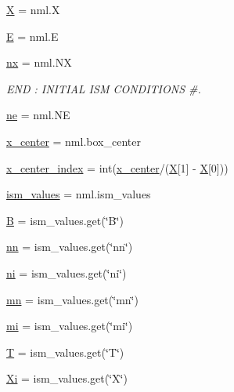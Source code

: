 \begin{DoxyCompactItemize}
\item 
\hyperlink{namespacesetup__adv_a6d9cd2ec966fe51739f30fabc346a12b}{X} = nml.\+X
\item 
\hyperlink{namespacesetup__adv_a5934fd9692b0afe75afd78fb1f301443}{E} = nml.\+E
\item 
\hyperlink{namespacesetup__adv_ae3a170bc8896f73d548a63402f551b27}{nx} = nml.\+NX
\begin{DoxyCompactList}\small\item\em E\+ND \+: I\+N\+I\+T\+I\+AL I\+SM C\+O\+N\+D\+I\+T\+I\+O\+NS \#. \end{DoxyCompactList}\item 
\hyperlink{namespacesetup__adv_a24c4d54f61a1e12e603b4c01192130b1}{ne} = nml.\+NE
\item 
\hyperlink{namespacesetup__adv_affa314aa4c3619c6df4ab64ad91ddfe4}{x\+\_\+center} = nml.\+box\+\_\+center
\item 
\hyperlink{namespacesetup__adv_aa4b9207992c9429f9848abddc21a9761}{x\+\_\+center\+\_\+index} = int(\hyperlink{namespacesetup__adv_affa314aa4c3619c6df4ab64ad91ddfe4}{x\+\_\+center}/(\hyperlink{namespacesetup__adv_a6d9cd2ec966fe51739f30fabc346a12b}{X}\mbox{[}1\mbox{]} -\/ \hyperlink{namespacesetup__adv_a6d9cd2ec966fe51739f30fabc346a12b}{X}\mbox{[}0\mbox{]}))
\item 
\hyperlink{namespacesetup__adv_a06530543894422f13a76b864a37af4e2}{ism\+\_\+values} = nml.\+ism\+\_\+values
\item 
\hyperlink{namespacesetup__adv_ab36f8fd154648083fa30d5ed49e666ab}{B} = ism\+\_\+values.\+get(\char`\"{}B\char`\"{})
\item 
\hyperlink{namespacesetup__adv_a3c2b0f58891c9e56cbc1fe3ad7d30eac}{nn} = ism\+\_\+values.\+get(\char`\"{}nn\char`\"{})
\item 
\hyperlink{namespacesetup__adv_a09dda3d707442518718ef3d1a891cb60}{ni} = ism\+\_\+values.\+get(\char`\"{}ni\char`\"{})
\item 
\hyperlink{namespacesetup__adv_a6518698eb0ca9b7e3fef73fbe47e1fb2}{mn} = ism\+\_\+values.\+get(\char`\"{}mn\char`\"{})
\item 
\hyperlink{namespacesetup__adv_a3fc3e54de0f48dfb9d2c8a642167edf3}{mi} = ism\+\_\+values.\+get(\char`\"{}mi\char`\"{})
\item 
\hyperlink{namespacesetup__adv_aa30f849c7ef0825e4e89e8767cfe75dd}{T} = ism\+\_\+values.\+get(\char`\"{}T\char`\"{})
\item 
\hyperlink{namespacesetup__adv_a90b1d04e08f3f7e3038cdbfb758ef399}{Xi} = ism\+\_\+values.\+get(\char`\"{}X\char`\"{})

\end{DoxyCompactItemize}
